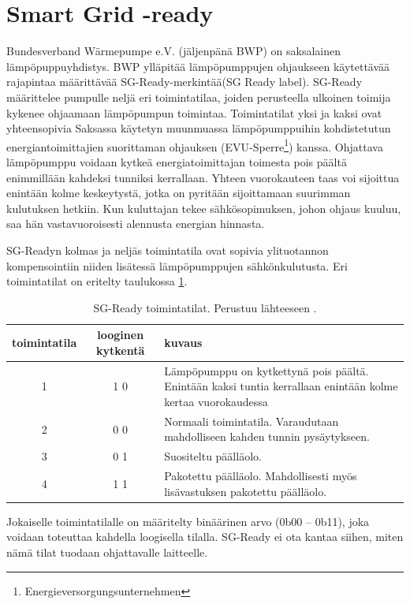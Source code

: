 \section{Smart Grid -ready}

  Bundesverband Wärmepumpe e.V. (jäljenpänä BWP) on saksalainen lämpöpuppuyhdistys. BWP ylläpitää lämpöpumppujen ohjaukseen käytettävää rajapintaa määrittävää \gls{SG}-Ready-merkintää(\gls{SG} Ready label). \gls{SG}-Ready määrittelee pumpulle neljä eri toimintatilaa, joiden perusteella ulkoinen toimija kykenee ohjaamaan lämpöpumpun toimintaa. Toimintatilat yksi ja kaksi ovat yhteensopivia Saksassa käytetyn muunmuassa lämpöpumppuihin kohdistetutun energiantoimittajien suorittaman ohjauksen (EVU-Sperre\footnote{Energieversorgungsunternehmen}) kanssa.\parencite{SGReadyReg} Ohjattava lämpöpumppu voidaan kytkeä energiatoimittajan toimesta pois päältä enimmillään kahdeksi tunniksi kerrallaan. Yhteen vuorokauteen taas voi sijoittua enintään kolme keskeytystä, jotka on pyritään sijoittamaan suurimman kulutuksen hetkiin. Kun kuluttajan tekee sähkösopimuksen, johon ohjaus kuuluu, saa hän vastavuoroisesti alennusta energian hinnasta.\parencite{enwg, VDEARN4100}

  SG-Readyn  kolmas ja neljäs toimintatila ovat sopivia ylituotannon kompensointiin niiden lisätessä lämpöpumppujen sähkönkulutusta. Eri toimintatilat on eritelty taulukossa \ref{sgready}.
  \begin{table}[h]
    \centering
    \caption[\gls{SG}-Ready toimintatilat]{\gls{SG}-Ready toimintatilat. Perustuu lähteeseen \parencite{SGReadyReg}.}
    \begin{tabular}{|c|c|p{3in}|}
      \hline
      \rowcolor{lightgray} toimintatila & looginen kytkentä & kuvaus \\\hline
      1 & 1 0 & Lämpöpumppu on kytkettynä pois päältä. Enintään kaksi tuntia kerrallaan enintään kolme kertaa vuorokaudessa \\\hline
      2 & 0 0 & Normaali toimintatila. Varaudutaan mahdolliseen kahden tunnin pysäytykseen. \\\hline
      3 & 0 1 & Suositeltu päälläolo. \\ \hline
      4 & 1 1 & Pakotettu päälläolo. Mahdollisesti myös lisävastuksen pakotettu päälläolo. \\\hline
    \end{tabular}
    \label{sgready}
  \end{table}
  Jokaiselle toimintatilalle on määritelty binäärinen arvo (0b00 -- 0b11), joka voidaan toteuttaa kahdella loogisella tilalla. SG-Ready ei ota kantaa siihen, miten nämä tilat tuodaan ohjattavalle laitteelle.\parencite{SGReadyReg}

